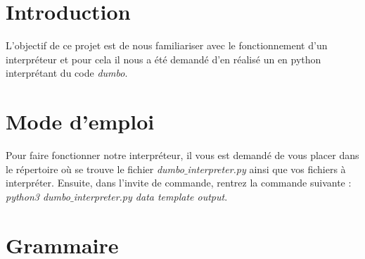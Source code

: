 \documentclass[a4paper, 12pt]{article}
\begin{document}
\tableofcontents

\newpage

\section{Introduction}

L'objectif de ce projet est de nous familiariser avec le fonctionnement d'un interpréteur et pour cela il nous a été demandé d'en réalisé un en python interprétant du code \textit{dumbo}.

\section{Mode d'emploi}

Pour faire fonctionner notre interpréteur, il vous est demandé de vous placer dans le répertoire où se trouve le fichier \textit{dumbo$\_$interpreter.py} ainsi que vos fichiers à interpréter. Ensuite, dans l'invite de commande, rentrez la commande suivante : \textit{python3 dumbo$\_$interpreter.py data template output}.

\section{Grammaire}
\end{document}
